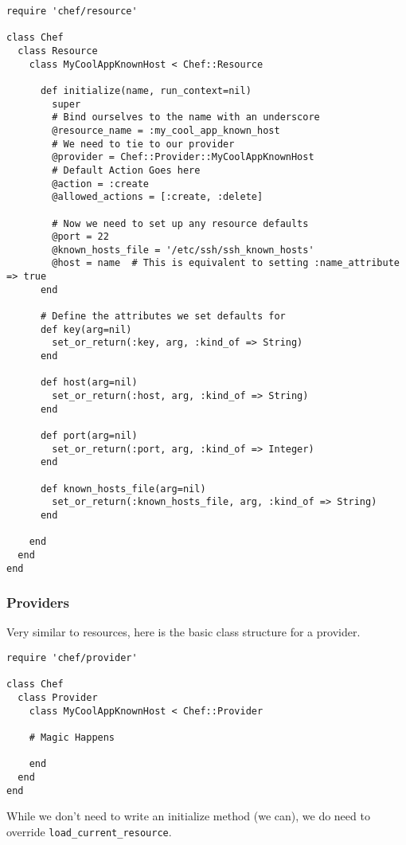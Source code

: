 \begin{lstlisting}[label=lst:cookbook-hwrp4]
require 'chef/resource'

class Chef
  class Resource
    class MyCoolAppKnownHost < Chef::Resource

      def initialize(name, run_context=nil)
        super
        # Bind ourselves to the name with an underscore
        @resource_name = :my_cool_app_known_host
        # We need to tie to our provider
        @provider = Chef::Provider::MyCoolAppKnownHost
        # Default Action Goes here
        @action = :create
        @allowed_actions = [:create, :delete]

        # Now we need to set up any resource defaults
        @port = 22
        @known_hosts_file = '/etc/ssh/ssh_known_hosts'
        @host = name  # This is equivalent to setting :name_attribute => true
      end

      # Define the attributes we set defaults for
      def key(arg=nil)
        set_or_return(:key, arg, :kind_of => String)
      end

      def host(arg=nil)
        set_or_return(:host, arg, :kind_of => String)
      end

      def port(arg=nil)
        set_or_return(:port, arg, :kind_of => Integer)
      end

      def known_hosts_file(arg=nil)
        set_or_return(:known_hosts_file, arg, :kind_of => String)
      end

    end
  end
end
\end{lstlisting}

\subsubsection{Providers}

Very similar to resources, here is the basic class structure for a provider.

\begin{lstlisting}[label=lst:cookbook-hwrp5]
require 'chef/provider'

class Chef
  class Provider
    class MyCoolAppKnownHost < Chef::Provider

    # Magic Happens

    end
  end
end
\end{lstlisting}

While we don't need to write an initialize method (we can), we do need to override \lstinline!load_current_resource!.

